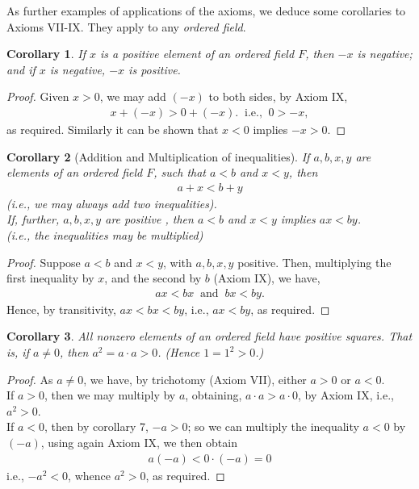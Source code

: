 \documentclass[12pt]{book}
\newtheorem{corollary}{Corollary}
\theoremstyle{definition}
\begin{document}
As further examples of applications of the axioms, we deduce some corollaries to Axioms VII-IX. They apply to any \textit{ordered field}.

\begin{corollary}
	If $x$ is a positive element of an ordered field $F$, then $-x$ is negative; and if $x$ is negative, $-x$ is positive. 
\end{corollary}
\begin{proof}
	Given $x>0$, we may add $(-x)$ to both sides, by Axiom IX,
	\begin{align*}
		x + (-x) >0	+(-x).\;\; \text{i.e.,}\;\; 0>-x, 
	\end{align*}
 as required. Similarly it can be shown that $x<0$ implies $-x>0$.
\end{proof}
\begin{corollary}[Addition and Multiplication of inequalities] If $a,b,x,y$ are elements of an ordered field $F$, such that $a<b$ and $x<y$, then 
\begin{align*}
	a+x<b+y
\end{align*}
(i.e., we may always add two inequalities).\\
\indent 
 If, further, $a,b,x,y$ are positive , then $a<b$ and $x<y$ implies $ax<by$.\\
 (i.e., the inequalities may be multiplied)
\end{corollary}
\begin{proof}
	Suppose $a<b$ and $x<y$, with $a,b,x,y$ positive. Then, multiplying the first inequality by $x$, and the second by $b$ (Axiom IX), we have,
	\begin{align*}
	ax<bx\;\;\text{and}\;\; bx<by.	
	\end{align*}
Hence, by transitivity, $ax<bx<by$, i.e., $ax<by$, as required.   
\end{proof}
\begin{corollary}
	All nonzero elements of an ordered field have positive squares. That is, if $a\neq 0$, then $a^2=a\cdot a >0$. (Hence $1= 1^2>0$.) 
\end{corollary}
\begin{proof}
	As $a\neq 0$, we have, by trichotomy (Axiom VII), either $a>0$ or $a<0$.\\
	If $a>0$, then we may multiply by $a$, obtaining, $a\cdot a > a\cdot 0$, by Axiom IX, i.e., $a^2>0$.\\
	If $a<0$, then by corollary 7, $-a>0$; so we can multiply the inequality $a<0$ by $(-a)$, using again Axiom IX, we then obtain
	\begin{align*}
	a(-a)<0\cdot (-a) =0	
	\end{align*}
i.e., $-a^2<0$, whence $a^2>0$, as required.   
\end{proof}
\end{document}
